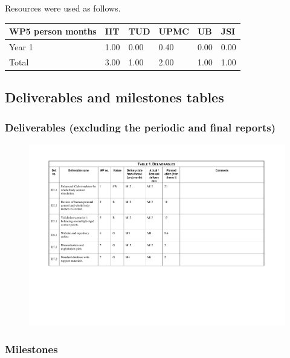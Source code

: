 \documentclass[12pt,a4paper,twoside]{article}
\begin{document}
Resources were used as follows.

\begin{center}
\begin{tabular}{|C{1.5cm}|C{1.5cm}|C{1.5cm}|C{2cm}|C{2cm}|C{2cm}|}
\hline
\footnotesize \textbf{WP5 person months}& \footnotesize \textbf{IIT}&\footnotesize \textbf{TUD}&\footnotesize \textbf{UPMC}& \footnotesize \textbf{UB} &\footnotesize \textbf{JSI}\\ \hline
\footnotesize Year 1 &  1.00 & 0.00 & 0.40 & 0.00 & 0.00 \\  \hline
\footnotesize Total & 3.00 & 1.00 & 2.00 & 1.00	 & 1.00 \\ \hline
\end{tabular}
\end{center}

\subsection{Deliverables and milestones tables}

\subsubsection{Deliverables (excluding the periodic and final reports)}

\begin{figure}[ht!]
\centering
\includegraphics[width=\textwidth]{./images/deliverables.pdf}
\end{figure}

\subsubsection{Milestones}
\end{document}
